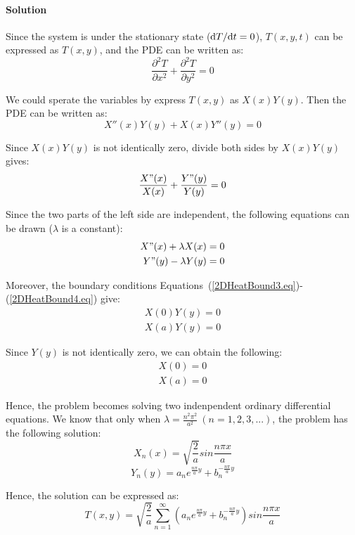 \paragraph{Solution}
Since the system is under the stationary state ($\mathrm d T/\mathrm d t=0$), $T(x,y,t)$ can be expressed as $T(x,y)$, and the PDE can be written as:
\begin{equation}
\frac{\partial^2T}{\partial x^2}+\frac{\partial^2T}{\partial y^2}=0
\end{equation}

We could sperate the variables by express $T(x,y)$ as $X(x)Y(y)$. Then the PDE can be written as:
\begin{equation}
X''(x)Y(y)+X(x)Y''(y)=0
\end{equation}

Since $X(x)Y(y)$ is not identically zero, divide both sides by $X(x)Y(y)$ gives:
\begin{equation}
\frac{X"(x)}{X(x)}+\frac{Y"(y)}{Y(y)}=0
\end{equation}

Since the two parts of the left side are independent, the following equations can be drawn ($\lambda$ is a constant):
\begin{align}
X"(x)+\lambda X(x)=0\\
Y"(y)-\lambda Y(y)=0
\end{align}

Moreover, the boundary conditions Equations~(\ref{2DHeatBound3.eq})-(\ref{2DHeatBound4.eq}) give:
\begin{align}
X(0)Y(y)=0\\
X(a)Y(y)=0
\end{align}

Since $Y(y)$ is not identically zero, we can obtain the following:
\begin{align}
X(0)=0\\
X(a)=0
\end{align}

Hence, the problem becomes solving two indenpendent ordinary differential equations. We know that only when $\lambda=\frac{n^2\pi^2}{a^2}\ (n=1,2,3,...)$, the problem has the following solution:
\begin{equation}
X_n(x)=\sqrt{\frac{2}{a}}sin\frac{n\pi x}{a}
\end{equation}
\begin{equation}
Y_n(y)=a_ne^{\frac{n\pi}{a}y}+b_n^{-\frac{n\pi}{a}y}
\end{equation}

Hence, the solution can be expressed as:
\begin{equation}
T(x,y)=\sqrt{\frac{2}{a}}\sum_{n=1}^{\infty}(a_ne^{\frac{n\pi}{a}y}+b_n^{-\frac{n\pi}{a}y})sin\frac{n\pi x}{a}
\end{equation}

